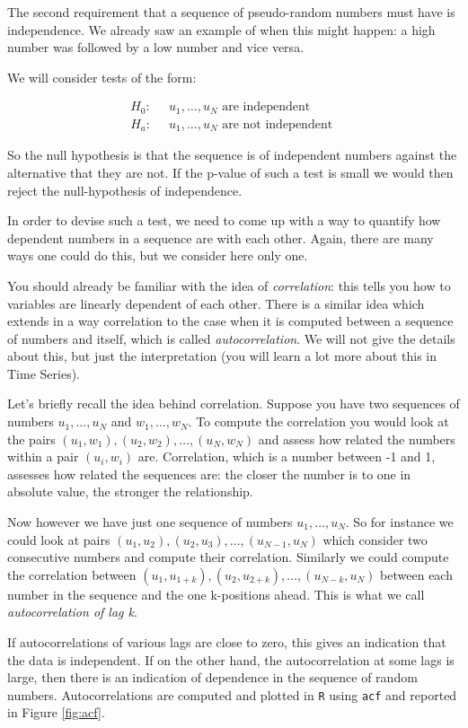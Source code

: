 \documentclass[
]{book}
\begin{document}
The second requirement that a sequence of pseudo-random numbers must have is independence. We already saw an example of when this might happen: a high number was followed by a low number and vice versa.

We will consider tests of the form:

\begin{align*}
H_0: & \;\;u_1,\dots,u_N \mbox{ are independent }\\
H_a: & \;\;u_1,\dots,u_N \mbox{ are not independent }
\end{align*}

So the null hypothesis is that the sequence is of independent numbers against the alternative that they are not. If the p-value of such a test is small we would then reject the null-hypothesis of independence.

In order to devise such a test, we need to come up with a way to quantify how dependent numbers in a sequence are with each other. Again, there are many ways one could do this, but we consider here only one.

You should already be familiar with the idea of \emph{correlation}: this tells you how to variables are linearly dependent of each other. There is a similar idea which extends in a way correlation to the case when it is computed between a sequence of numbers and itself, which is called \emph{autocorrelation}. We will not give the details about this, but just the interpretation (you will learn a lot more about this in Time Series).

Let's briefly recall the idea behind correlation. Suppose you have two sequences of numbers \(u_1,\dots,u_N\) and \(w_1,\dots,w_N\). To compute the correlation you would look at the pairs \((u_1,w_1),(u_2,w_2),\dots, (u_N,w_N)\) and assess how related the numbers within a pair \((u_i,w_i)\) are. Correlation, which is a number between -1 and 1, assesses how related the sequences are: the closer the number is to one in absolute value, the stronger the relationship.

Now however we have just one sequence of numbers \(u_1,\dots,u_N\). So for instance we could look at pairs \((u_1,u_2), (u_2,u_3), \dots, (u_{N-1},u_{N})\) which consider two consecutive numbers and compute their correlation. Similarly we could compute the correlation between \((u_1,u_{1+k}), (u_2,u_{2+k}),\dots, (u_{N-k},u_N)\) between each number in the sequence and the one k-positions ahead. This is what we call \emph{autocorrelation of lag k}.

If autocorrelations of various lags are close to zero, this gives an indication that the data is independent. If on the other hand, the autocorrelation at some lags is large, then there is an indication of dependence in the sequence of random numbers. Autocorrelations are computed and plotted in \texttt{R} using \texttt{acf} and reported in Figure \ref{fig:acf}.
\end{document}
